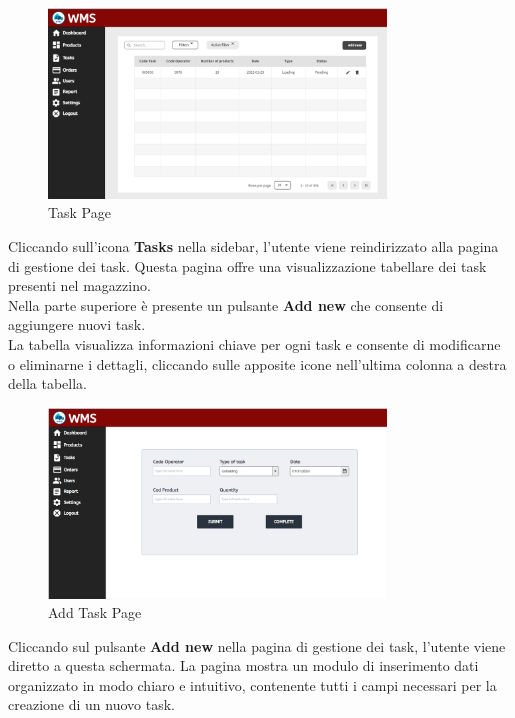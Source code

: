 \begin{figure}[H]
    \centering
    \includegraphics[width=0.8\textwidth]{document/sections/img/taskPage.png}
    \caption{Task Page}
    \label{fig:taskPage}
\end{figure}

Cliccando sull'icona \textbf{Tasks} nella sidebar, l'utente viene reindirizzato alla pagina di gestione dei task.
Questa pagina offre una visualizzazione tabellare dei task presenti nel magazzino.\\
Nella parte superiore è presente un pulsante \textbf{Add new} che consente di aggiungere nuovi task.\\
La tabella visualizza informazioni chiave per ogni task e consente di modificarne o eliminarne i dettagli,
cliccando sulle apposite icone nell'ultima colonna a destra della tabella.

\begin{figure}[H]
    \centering
    \includegraphics[width=0.8\textwidth]{document/sections/img/addTask.png}
    \caption{Add Task Page}
    \label{fig:addTaskPage}
\end{figure}

Cliccando sul pulsante \textbf{Add new} nella pagina di gestione dei task,
l'utente viene diretto a questa schermata.
La pagina mostra un modulo di inserimento dati organizzato in modo chiaro e intuitivo,
contenente tutti i campi necessari per la creazione di un nuovo task.

